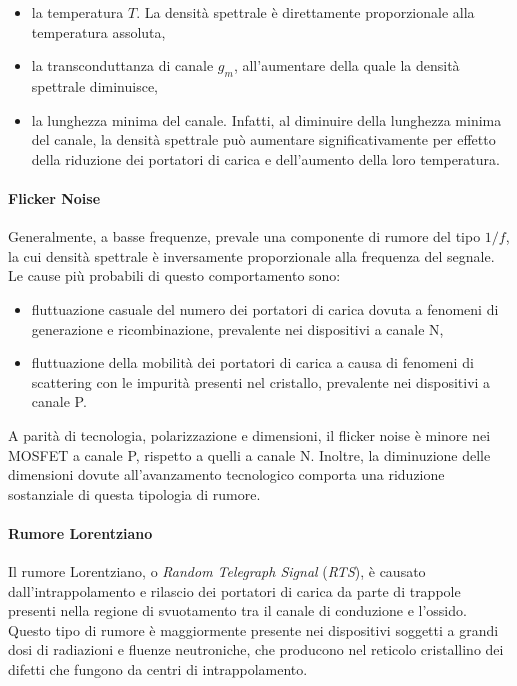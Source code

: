 \begin{itemize}
  \item la temperatura $T$. La densità spettrale è direttamente proporzionale alla temperatura assoluta,
  \item la transconduttanza di canale $g_m$, all'aumentare della quale la densità spettrale diminuisce,
  \item la lunghezza minima del canale. Infatti, al diminuire della lunghezza minima del canale, la densità spettrale può aumentare significativamente per effetto della riduzione dei portatori di carica e dell'aumento della loro temperatura.
\end{itemize}

\paragraph*{Flicker Noise}
Generalmente, a basse frequenze, prevale una componente di rumore del tipo $1/f$, la cui densità spettrale è inversamente proporzionale alla frequenza del segnale. Le cause più probabili di questo comportamento sono: 
\begin{itemize}
  \item fluttuazione casuale del numero dei portatori di carica dovuta a fenomeni di generazione e ricombinazione, prevalente nei dispositivi a canale N,
  \item fluttuazione della mobilità dei portatori di carica a causa di fenomeni di scattering con le impurità presenti nel cristallo, prevalente nei dispositivi a canale P.
\end{itemize}

A parità di tecnologia, polarizzazione e dimensioni, il flicker noise è minore nei MOSFET a canale P, rispetto a quelli a canale N. Inoltre, la diminuzione delle dimensioni dovute all'avanzamento tecnologico comporta una riduzione sostanziale di questa tipologia di rumore.

\paragraph*{Rumore Lorentziano}
Il rumore Lorentziano, o \emph{Random Telegraph Signal} (\emph{RTS}), è causato dall'intrappolamento e rilascio dei portatori di carica da parte di trappole presenti nella regione di svuotamento tra il canale di conduzione e l'ossido. Questo tipo di rumore è maggiormente presente nei dispositivi soggetti a grandi dosi di radiazioni e fluenze neutroniche, che producono nel reticolo cristallino dei difetti che fungono da centri di intrappolamento.

